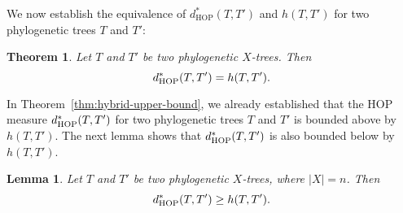 \documentclass{article}
\newtheorem{lemma}{Lemma}
\newtheorem{theorem}{Theorem}
\newcommand{\HOP}{\mathrm{HOP}}
\begin{document}
We now establish the equivalence of $d^*_\HOP(T,T')$ and $h(T,T')$ for two phylogenetic trees $T$ and $T'$:

\begin{theorem}\label{thm:hop-equals-hybrid}
Let $T$ and $T'$ be two phylogenetic $X$-trees. Then
$$d^*_{\rm HOP}(T, T') = h(T, T').$$
\end{theorem}

In Theorem~\ref{thm:hybrid-upper-bound}, we already established that the HOP measure $d^*_{\rm HOP}(T,T')$ for two phylogenetic trees $T$ and $T'$ is bounded above by $h(T,T')$. The next lemma shows that $d^*_{\rm HOP}(T,T')$ is also bounded below by $h(T,T')$.

\begin{lemma}\label{lem:inequality2}
Let $T$ and $T'$ be two  phylogenetic $X$-trees, where $|X|=n$. Then
$$d^*_{\rm HOP}(T, T')\ge h(T, T').$$
\end{lemma}
\end{document}
